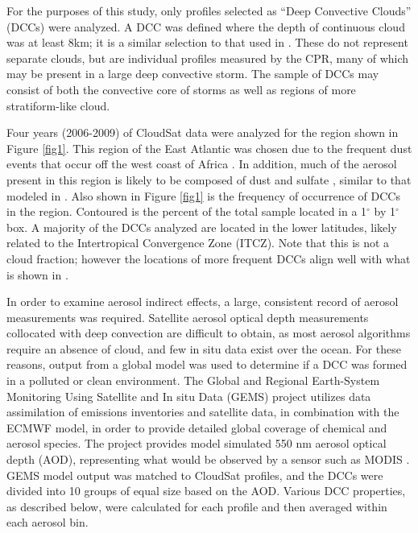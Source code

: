 For the purposes of this study, only profiles selected as ``Deep Convective Clouds'' (DCCs) were analyzed.  A DCC was defined where the depth of continuous cloud was at least 8km; it is a similar selection to that used in \citet{rcepaper}.  These do not represent separate clouds, but are individual profiles measured by the CPR, many of which may be present in a large deep convective storm.  The sample of DCCs may consist of both the convective core of storms as well as regions of more stratiform-like cloud.  

Four years (2006-2009) of CloudSat data were analyzed for the region shown in Figure \ref{fig1}.  This region of the East Atlantic was chosen due to the frequent dust events that occur off the west coast of Africa \citep{carlsonsal,Zipser:2009p7664}.  In addition, much of the aerosol present in this region is likely to be composed of dust and sulfate \citep{Zipser:2009p7664}, similar to that modeled in \cite{rcepaper}.  Also shown in Figure \ref{fig1} is the frequency of occurrence of DCCs in the region.  Contoured is the percent of the total sample located in a 1$^{\circ}$ by 1$^{\circ}$ box.  A majority of the DCCs analyzed are located in the lower latitudes, likely related to the Intertropical Convergence Zone (ITCZ).  Note that this is not a cloud fraction; however the locations of more frequent DCCs align well with what is shown in \citet{Liu:2007p74}.

In order to examine aerosol indirect effects, a large, consistent record of aerosol measurements was required.  Satellite aerosol optical depth measurements collocated with deep convection are difficult to obtain, as most aerosol algorithms require an absence of cloud, and few in situ data exist over the ocean.  For these reasons, output from a global model was used to determine if a DCC was formed in a polluted or clean environment.  The Global and Regional Earth-System Monitoring Using Satellite and In situ Data (GEMS) project \citep{Hollingsworth:2008p8503} utilizes data assimilation of emissions inventories and satellite data, in combination with the ECMWF model, in order to provide detailed global coverage of chemical and aerosol species.  The project provides model simulated 550 nm aerosol optical depth (AOD), representing what would be observed by a sensor such as MODIS \citep[Moderate Resolution Imaging Spectroradiometer,][]{Remer:2005p3445}. GEMS model output was matched to CloudSat profiles, and the DCCs were divided into 10 groups of equal size based on the AOD.  Various DCC properties, as described below, were calculated for each profile and then averaged within each aerosol bin.  


